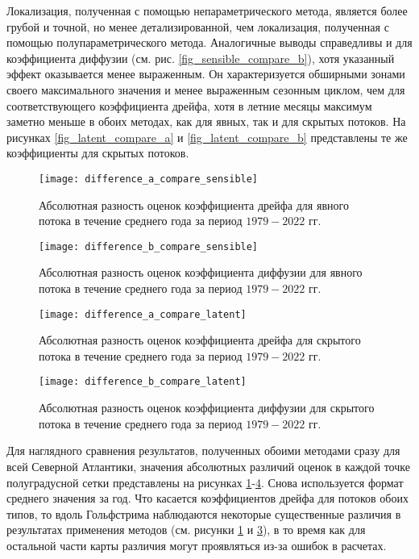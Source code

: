 Локализация, полученная с помощью непараметрического метода, является более грубой и точной, но менее детализированной, чем локализация, полученная с помощью полупараметрического метода. Аналогичные выводы справедливы и для коэффициента диффузии (см. рис. \ref{fig_sensible_compare_b}), хотя указанный эффект оказывается менее выраженным. Он характеризуется обширными зонами своего максимального значения и менее выраженным сезонным циклом, чем для соответствующего коэффициента дрейфа, хотя в летние месяцы максимум заметно меньше в обоих методах, как для явных, так и для скрытых потоков. На рисунках \ref{fig_latent_compare_a} и \ref{fig_latent_compare_b} представлены те же коэффициенты для скрытых потоков.

\begin{figure}[!h]
	\centering
	\texttt{[image: difference\_a\_compare\_sensible]}
	\caption{Абсолютная разность оценок коэффициента дрейфа для явного потока в течение среднего года за период $1979-2022$ гг.} 
	\label{fig_sensible_difference_a}
\end{figure}


\begin{figure}[!h]
	\centering
	\texttt{[image: difference\_b\_compare\_sensible]}
	\caption{Абсолютная разность оценок коэффициента диффузии для явного потока в течение среднего года за период $1979-2022$ гг.} 
	\label{fig_sensible_difference_b}
\end{figure}

\begin{figure}[!h]
	\centering
	\texttt{[image: difference\_a\_compare\_latent]}
	\caption{Абсолютная разность оценок коэффициента дрейфа для скрытого потока в течение среднего года за период $1979-2022$ гг.} 
	\label{fig_latent_difference_a}
\end{figure}


\begin{figure}[!h]
	\centering
	\texttt{[image: difference\_b\_compare\_latent]}
	\caption{Абсолютная разность оценок коэффициента диффузии для скрытого потока в течение среднего года за период $1979-2022$ гг.} 
	\label{fig_latent_difference_b}
\end{figure}

Для наглядного сравнения результатов, полученных обоими методами сразу для всей Северной Атлантики, значения абсолютных различий оценок в каждой точке полуградусной сетки представлены на рисунках \ref{fig_sensible_difference_a}-\ref{fig_latent_difference_b}. Снова используется формат среднего значения за год.
Что касается коэффициентов дрейфа для потоков обоих типов, то вдоль Гольфстрима наблюдаются некоторые существенные различия в результатах применения методов (см. рисунки \ref{fig_sensible_difference_a} и \ref{fig_latent_difference_a}), в то время как для остальной части карты различия могут проявляться из-за ошибок в расчетах.

